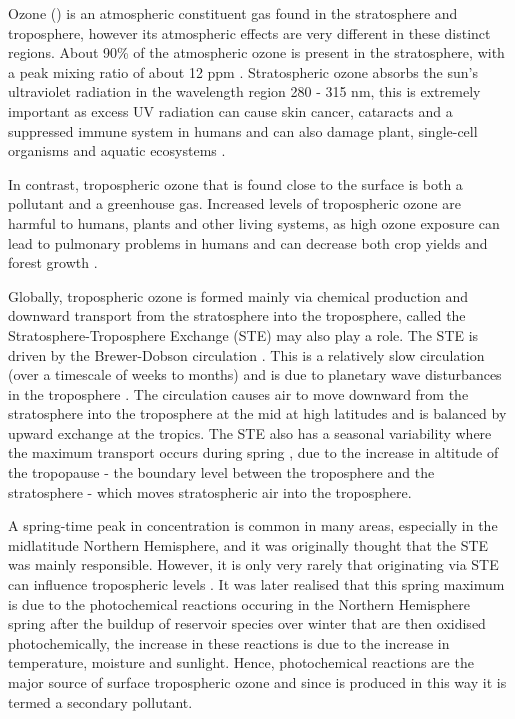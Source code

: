 Ozone () is an atmospheric constituent gas found in the stratosphere and troposphere, however its atmospheric effects are very different in these distinct regions.
About 90\% of the atmospheric ozone is present in the stratosphere, with a peak mixing ratio of about 12 ppm \citep{Seinfeld:2006}.
Stratospheric ozone absorbs the sun's ultraviolet radiation in the wavelength region 280 - 315 nm, this is extremely important as excess UV radiation can cause skin cancer, cataracts and a suppressed immune system in humans and can also damage plant, single-cell organisms and aquatic ecosystems \citep{WMO:2010}. 

In contrast, tropospheric ozone that is found close to the surface is both a pollutant and a greenhouse gas. 
Increased levels of tropospheric ozone are harmful to humans, plants and other living systems, as high ozone exposure can lead to pulmonary problems in humans and can decrease both crop yields and forest growth \citep{WMO:2010}. 

Globally, tropospheric ozone is formed mainly via chemical production and downward transport from the stratosphere into the troposphere, called the Stratosphere-Troposphere Exchange (STE) may also play a role. 
The STE is driven by the Brewer-Dobson circulation \citep{Brewer:1949, Dobson:1956}.  
This is a relatively slow circulation (over a timescale of weeks to months) and is due to planetary wave disturbances in the troposphere \citep{Haynes:1991}.
The circulation causes air to move downward from the stratosphere into the troposphere at the mid at high latitudes and is balanced by upward exchange at the tropics. 
The STE also has a seasonal variability where the maximum transport occurs during spring \citep{Appenzeller:1996}, due to the increase in altitude of the tropopause - the boundary level between the troposphere and the stratosphere - which moves stratospheric air into the troposphere. 

A spring-time peak in  concentration is common in many areas, especially in the midlatitude Northern Hemisphere, and it was originally thought that the STE was mainly responsible. 
However, it is only very rarely that  originating via STE can influence tropospheric  levels \citep{Lelieveld:2000}. 
It was later realised that this spring maximum is due to the photochemical reactions occuring in the Northern Hemisphere spring after the buildup of reservoir species over winter \citep{Penkett:1986} that are then oxidised photochemically, the increase in these reactions is due to the increase in temperature, moisture and sunlight.
Hence, photochemical reactions are the major source of surface tropospheric ozone \citep{Lelieveld:2000} and since  is produced in this way it is termed a secondary pollutant.


